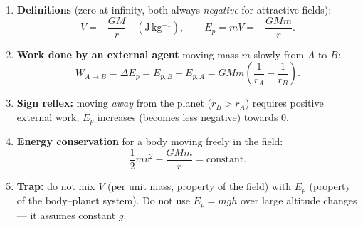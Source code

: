 \documentclass[11pt]{article}
\begin{document}
\begin{methode}
\begin{enumerate}
\item \textbf{Definitions} (zero at infinity, both always \emph{negative} for attractive fields):
\[ V = -\frac{GM}{r} \quad (\mathrm{J\,kg^{-1}}), \qquad E_p = mV = -\frac{GMm}{r}. \]
\item \textbf{Work done by an external agent} moving mass $m$ slowly from $A$ to $B$:
\[ W_{A\to B} = \Delta E_p = E_{p,B} - E_{p,A} = GMm\left(\frac{1}{r_A} - \frac{1}{r_B}\right). \]
\item \textbf{Sign reflex:} moving \emph{away} from the planet ($r_B > r_A$) requires positive external work; $E_p$ increases (becomes less negative) towards $0$.
\item \textbf{Energy conservation} for a body moving freely in the field:
\[ \frac{1}{2}mv^{2} - \frac{GMm}{r} = \text{constant}. \]
\item \textbf{Trap:} do not mix $V$ (per unit mass, property of the field) with $E_p$ (property of the body–planet system). Do not use $E_p = mgh$ over large altitude changes — it assumes constant $g$.
\end{enumerate}
\end{methode}
\end{document}
